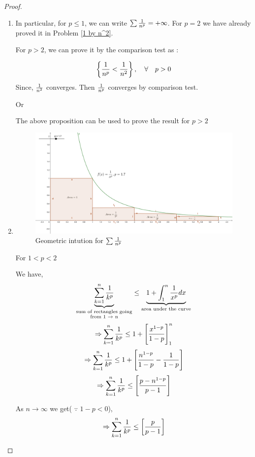 \documentclass{notes}
\begin{document}
\begin{proof}
	\begin{enumerate}
		\item
		In particular, for $p\leq 1$, we can write $\sum{1 \over n^p}  = + \infty$.
		For $ p = 2$ we have already proved it in Problem \ref{1 by n^2}.
		
		For $p>2$, we can prove it by the comparison test as :
		
		$$ \left\{{1 \over n^p } < {1 \over n^2}\right\}, \quad \forall \quad p>0$$ 
		Since, ${1 \over n^2}$ converges. Then ${1 \over n^p}$ converges by comparison test.
		\begin{center}
			Or
		\end{center}
		The above proposition can be used to prove the result for $p>2$
		
		\item
		\begin{figure}[h!]  %
			\begin{center}
				\includegraphics[width=\textwidth]{resources/geogebra.png}
				\caption{Geometric intution for $\sum{1 \over n^p }$}
			\end{center}
		\end{figure}
		For $ 1 < p<2$
		
		We have,
		$$ \underbrace{\sum_{k=1}^{n} {1 \over k^p}}_{\substack{ \text{sum of rectangles going} \\ \text{from 1 $\to$ n}}} \leq \underbrace{1 + \int_{1}^{n} {1 \over x^p}dx}_\text{area under the curve} $$
		$$   \Rightarrow \sum_{k=1}^{n} {1 \over k^p} \leq 1 + \left[ x^{1-p} \over {1-p} \right]_{1}^{n}      $$
		$$ \Rightarrow   \sum_{k=1}^{n} {1 \over k^p} \leq 1 + \left[ {n^{1-p} \over {1-p} } - {1 \over {1-p}}\right]     $$
		$$ \Rightarrow   \sum_{k=1}^{n} {1 \over k^p} \leq \left[ {p - n^{1-p} \over p-1} \right]     $$
		
		As $ n\to \infty$ we get( $\because$ $1-p<0$),
		$$ \Rightarrow   \sum_{k=1}^{n} {1 \over k^p} \leq \left[ {p \over p-1} \right]     $$
	
	\end{enumerate}
	
\end{proof}
\end{document}

